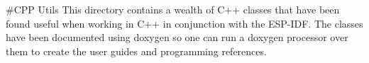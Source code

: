 \#\+C\+PP Utils This directory contains a wealth of C++ classes that have been found useful when working in C++ in conjunction with the E\+S\+P-\/\+I\+DF. The classes have been documented using {\ttfamily doxygen} so one can run a doxygen processor over them to create the user guides and programming references. 